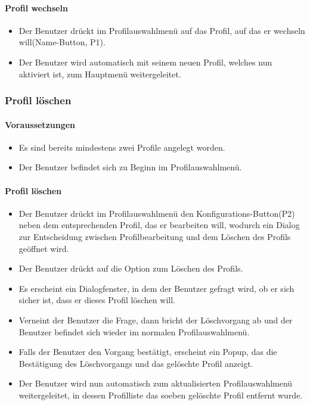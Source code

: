 \paragraph{Profil wechseln}
\begin{itemize}
	\item Der Benutzer drückt im Profilauswahlmenü auf das Profil, auf das er wechseln will(Name-Button, P1).
	\item Der Benutzer wird automatisch mit seinem neuen Profil, welches nun aktiviert ist, zum Hauptmenü weitergeleitet.
\end{itemize}

\subsubsection{Profil löschen}
\paragraph{Voraussetzungen}
\begin{itemize}
	\item Es sind bereits mindestens zwei Profile angelegt worden.
	\item Der Benutzer befindet sich zu Beginn im Profilauswahlmenü.
\end{itemize}
\paragraph{Profil löschen}
\begin{itemize}
	\item Der Benutzer drückt im Profilauswahlmenü den Konfigurations-Button(P2) neben dem entsprechenden Profil, das er bearbeiten will, wodurch ein Dialog zur Entscheidung zwischen Profilbearbeitung und dem Löschen des Profils geöffnet wird.
	\item Der Benutzer drückt auf die Option zum Löschen des Profils.
	\item Es erscheint ein Dialogfenster, in dem der Benutzer gefragt wird, ob er sich sicher ist, dass er dieses Profil löschen will.
	\item Verneint der Benutzer die Frage, dann bricht der Löschvorgang ab und der Benutzer befindet sich wieder im normalen Profilauswahlmenü.
	\item Falls der Benutzer den Vorgang bestätigt, erscheint ein Popup, das die Bestätigung des Löschvorgangs und das gelöschte Profil anzeigt.
	\item Der Benutzer wird nun automatisch zum aktualisierten Profilauswahlmenü weitergeleitet, in dessen Profilliste das soeben gelöschte Profil entfernt wurde.
\end{itemize}

